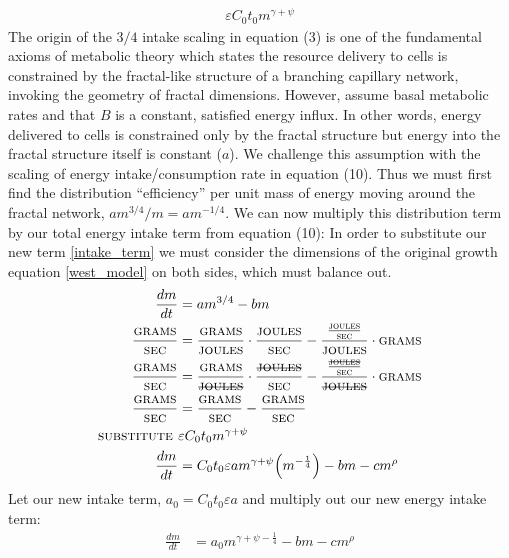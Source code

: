 \documentclass[a4paper]{article} %
\begin{document}
\begin{align}
    \varepsilon C_{0}t_{0}m^{\gamma + \psi} \label{intake_term}
\end{align} 
The origin of the $3/4$ intake scaling in equation (3) is one of the fundamental axioms of metabolic theory \autocite{West1997,West2001} which states the resource delivery to cells is constrained by the fractal-like structure of a branching capillary network, invoking the geometry of fractal dimensions. However, \cite{West2001} assume basal metabolic rates and that $B$ is a constant, satisfied energy influx. In other words, energy delivered to cells is constrained only by the fractal structure but energy into the fractal structure itself is constant ($a$). We challenge this assumption with the scaling of energy intake/consumption rate in equation (10). Thus we must first find the distribution ``efficiency'' per unit mass of energy moving around the fractal network, ${am^{3/4}}/m = am^{-1/4}$. We can now multiply this distribution term by our total energy intake term from equation (10):
In order to substitute our new term \eqref{intake_term} we must consider the dimensions of the original growth equation \eqref{west_model} on both sides, which must balance out.
\begin{align}
    \frac{dm}{dt} &= am^{3/4} - bm \\
    \frac{\textsc{grams}}{\textsc{sec}} &= \frac{\textsc{grams}}{\textsc{joules}}\cdot \frac{\textsc{joules}}{\textsc{sec}} - \frac{\frac{\textsc{joules}}{\textsc{sec}}}{\textsc{joules}}\cdot \textsc{grams} \\
    \frac{\textsc{grams}}{\textsc{sec}} &= \frac{\textsc{grams}}{\st{\textsc{joules}}}\cdot \frac{\st{\textsc{joules}}}{\textsc{sec}} - \frac{\frac{\st{\textsc{joules}}}{\textsc{sec}}}{\st{\textsc{joules}}}\cdot \textsc{grams} \\
    \frac{\textsc{grams}}{\textsc{sec}} &= \frac{\textsc{grams}}{\textsc{sec}} - \frac{\textsc{grams}}{\textsc{sec}} \\
    \textsc{substitute } & \varepsilon C_{0}t_{0}m^{\gamma + \psi} \\
    \frac{dm}{dt} &= C_{0}t_{0}\varepsilon am^{\gamma + \psi}\Big(m^{-\frac{1}{4}}\Big) - bm - cm^{\rho}
\end{align}
Let our new intake term, $a_0 = C_{0}t_{0}\varepsilon a$ and multiply out our new energy intake term:
\begin{align}
    \frac{dm}{dt} &= a_{0}m^{\gamma + \psi -\frac{1}{4}} - bm - cm^{\rho}
\end{align}
\end{document}
